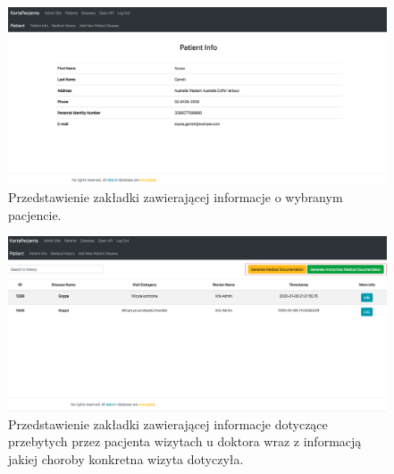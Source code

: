 \begin{figure}[H]
\centering
\includegraphics[width=15cm]{pictures/service/05-patient_info}
\caption{Przedstawienie zakładki zawierającej informacje o wybranym pacjencie.}
\end{figure}

\begin{figure}[H]
\centering
\includegraphics[width=15cm]{pictures/service/06-choroby_pacjenta}
\caption{Przedstawienie zakładki zawierającej informacje dotyczące przebytych przez pacjenta wizytach u doktora wraz z informacją jakiej choroby konkretna wizyta dotyczyła.}
\end{figure}

